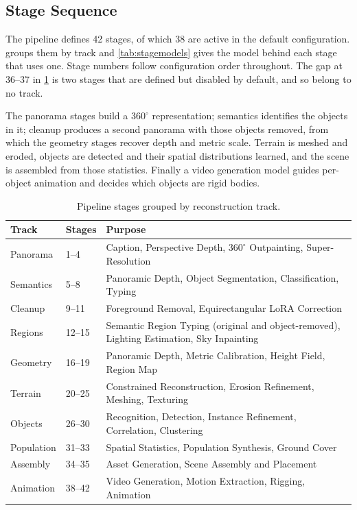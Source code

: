 \subsection{Stage Sequence}

The pipeline defines 42 stages, of which 38 are active in the default
configuration.  groups them by track and
\cref{tab:stagemodels} gives the model behind each stage that uses one. Stage
numbers follow configuration order throughout. The gap at 36--37 in
\cref{tab:stages} is two stages that are defined but disabled by default, and so
belong to no track.

The panorama stages build a $360^\circ$ representation; semantics identifies the
objects in it; cleanup produces a second panorama with those objects removed, from
which the geometry stages recover depth and metric scale. Terrain is meshed and
eroded, objects are detected and their spatial distributions learned, and the scene
is assembled from those statistics. Finally a video generation model guides
per-object animation and decides which objects are rigid bodies.

\begin{table}[htbp]
\centering
\small
\caption{Pipeline stages grouped by reconstruction track.}
\label{tab:stages}
\begin{tabular}{@{}llp{7.4cm}@{}}
\toprule
\textbf{Track} & \textbf{Stages} & \textbf{Purpose} \\
\midrule
Panorama    & 1--4   & Caption, Perspective Depth, $360^\circ$ Outpainting, Super-Resolution \\
Semantics   & 5--8   & Panoramic Depth, Object Segmentation, Classification, Typing \\
Cleanup     & 9--11  & Foreground Removal, Equirectangular LoRA Correction \\
Regions     & 12--15 & Semantic Region Typing (original and object-removed), Lighting Estimation, Sky Inpainting \\
Geometry    & 16--19 & Panoramic Depth, Metric Calibration, Height Field, Region Map \\
Terrain     & 20--25 & Constrained Reconstruction, Erosion Refinement, Meshing, Texturing \\
Objects     & 26--30 & Recognition, Detection, Instance Refinement, Correlation, Clustering \\
Population  & 31--33 & Spatial Statistics, Population Synthesis, Ground Cover \\
Assembly    & 34--35 & Asset Generation, Scene Assembly and Placement \\
Animation   & 38--42 & Video Generation, Motion Extraction, Rigging, Animation \\
\bottomrule
\end{tabular}
\end{table}

